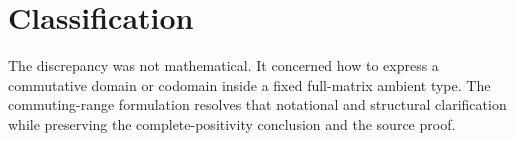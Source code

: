 \documentclass{article}
\begin{document}
\section{Classification}

The discrepancy was not mathematical. It concerned how to express a
commutative domain or codomain inside a fixed full-matrix ambient type. The
commuting-range formulation resolves that notational and structural
clarification while preserving the complete-positivity conclusion and the
source proof.



\end{document}
